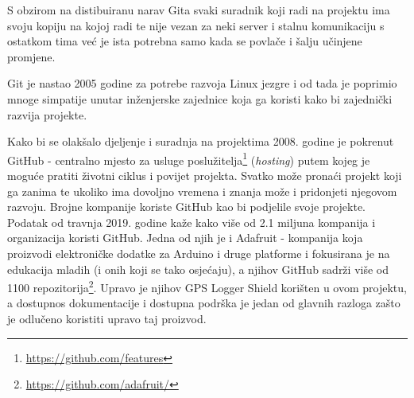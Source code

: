 S obzirom na distibuiranu narav Gita svaki suradnik koji radi na projektu ima svoju kopiju na kojoj radi te nije vezan za neki server i stalnu komunikaciju s ostatkom tima već je ista potrebna samo kada se povlače i šalju učinjene promjene.

Git je nastao 2005 godine za potrebe razvoja Linux jezgre i od tada je poprimio mnoge simpatije unutar inženjerske zajednice koja ga koristi kako bi zajednički razvija projekte.

Kako bi se olakšalo djeljenje i suradnja na projektima 2008. godine je pokrenut GitHub - centralno mjesto za usluge poslužitelja\footnote{\href{https://github.com/features}{https://github.com/features}} (\textit{hosting}) putem kojeg je moguće pratiti životni ciklus i povijet projekta.
Svatko može pronaći projekt koji ga zanima te ukoliko ima dovoljno vremena i znanja može i pridonjeti njegovom razvoju.
Brojne kompanije koriste GitHub kao bi podjelile svoje projekte. Podatak od travnja 2019. godine kaže kako više od 2.1 miljuna kompanija i organizacija koristi GitHub.
Jedna od njih je i Adafruit - kompanija koja proizvodi elektroničke dodatke za Arduino i druge platforme i fokusirana je na edukacija mladih (i onih koji se tako osjećaju), a njihov GitHub sadrži više od 1100 repozitorija\footnote{\href{https://github.com/adafruit}{https://github.com/adafruit/}}.
Upravo je njihov GPS Logger Shield korišten u ovom projektu, a dostupnos dokumentacije i dostupna podrška je jedan od glavnih razloga zašto je odlučeno koristiti upravo taj proizvod.
